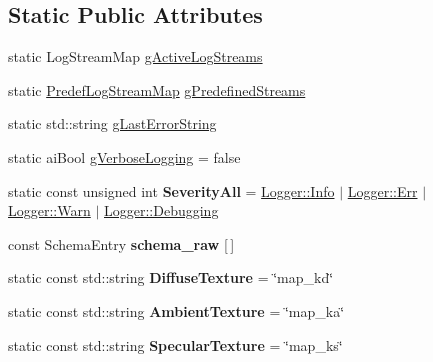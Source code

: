 \subsection*{Static Public Attributes}
\begin{DoxyCompactItemize}
\item 
static Log\+Stream\+Map \hyperlink{class_assimp_a9ef8ca5f186af017ce60e63e4865ad61}{g\+Active\+Log\+Streams}
\item 
static \hyperlink{class_assimp_af711f465b88b72eeaaa5456ee8b42363}{Predef\+Log\+Stream\+Map} \hyperlink{class_assimp_a6ffd4b6612c75ee688b5f419f2701a08}{g\+Predefined\+Streams}
\item 
static std\+::string \hyperlink{class_assimp_a00211f6e0485b3428887d17352469e13}{g\+Last\+Error\+String}
\item 
static ai\+Bool \hyperlink{class_assimp_ad3e8dfd6154bf682588538967de0db4a}{g\+Verbose\+Logging} = false
\item 
\hypertarget{class_assimp_a6a890028f9e4d9c9a926543e7e8899a8}{static const unsigned int {\bfseries Severity\+All} = \hyperlink{class_assimp_1_1_logger_acd0b52a87d6fc11e957ed2c6e2ad75b6aa3377a574928b86f7de55c5df154f461}{Logger\+::\+Info} $\vert$ \hyperlink{class_assimp_1_1_logger_acd0b52a87d6fc11e957ed2c6e2ad75b6a71054d0b1323abcea46d050d69013d27}{Logger\+::\+Err} $\vert$ \hyperlink{class_assimp_1_1_logger_acd0b52a87d6fc11e957ed2c6e2ad75b6a1279c77aaee5a3d7df835a9b9305a697}{Logger\+::\+Warn} $\vert$ \hyperlink{class_assimp_1_1_logger_acd0b52a87d6fc11e957ed2c6e2ad75b6a0cb475014d27098c3423738c571d857f}{Logger\+::\+Debugging}}\label{class_assimp_a6a890028f9e4d9c9a926543e7e8899a8}

\item 
const Schema\+Entry {\bfseries schema\+\_\+raw} \mbox{[}$\,$\mbox{]}
\item 
\hypertarget{class_assimp_a87badfe4ed3e26d90007d44a25d527a8}{static const std\+::string {\bfseries Diffuse\+Texture} = \char`\"{}map\+\_\+kd\char`\"{}}\label{class_assimp_a87badfe4ed3e26d90007d44a25d527a8}

\item 
\hypertarget{class_assimp_afc47241d2522031b02424eaf3d265055}{static const std\+::string {\bfseries Ambient\+Texture} = \char`\"{}map\+\_\+ka\char`\"{}}\label{class_assimp_afc47241d2522031b02424eaf3d265055}

\item 
\hypertarget{class_assimp_abf8b29b9d57069be3222c9fc016b4166}{static const std\+::string {\bfseries Specular\+Texture} = \char`\"{}map\+\_\+ks\char`\"{}}\label{class_assimp_abf8b29b9d57069be3222c9fc016b4166}


\end{DoxyCompactItemize}
